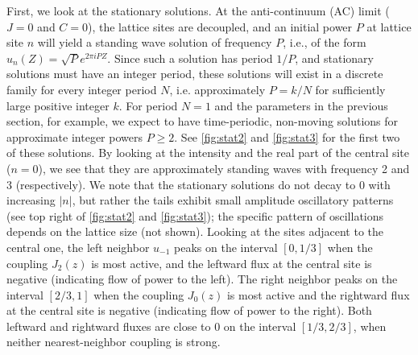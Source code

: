 \documentclass[reprint, amsmath,amssymb,aps,pre]{revtex4-2}
\begin{document}
First, we look at the stationary solutions. At the anti-continuum (AC) limit ($J=0$ and $C=0$), the lattice sites are decoupled, and an initial power $P$ at lattice site $n$ will yield a standing wave solution of frequency $P$, i.e., of the form $u_n(Z) = \sqrt{P} e^{ 2 \pi i P Z}$. Since such a solution has period $1/P$, and stationary solutions must have an integer period, these solutions will exist in a discrete family for every integer period $N$, i.e. approximately $P = k/N$ for sufficiently large positive integer $k$. For period $N=1$ and the parameters in the previous section, for example, we expect to have
time-periodic, non-moving solutions for approximate integer powers $P \geq 2$. See \cref{fig:stat2} and \cref{fig:stat3} for the first two of these solutions. By looking at the intensity and the real part of the central site ($n=0$), we see that they are approximately standing waves with frequency 2 and 3 (respectively). We note that the stationary solutions do not decay to 0 with increasing $|n|$, but rather the tails exhibit small amplitude oscillatory patterns (see top right of \cref{fig:stat2} and \cref{fig:stat3}); the specific pattern of oscillations depends on the lattice size (not shown).
Looking at the sites adjacent to the central one, the left neighbor $u_{-1}$ peaks on the interval $[0,1/3]$ when the coupling $J_2(z)$ is most active, and the leftward flux at the central site is negative (indicating flow of power to the left). The right neighbor peaks on the interval $[2/3, 1]$ when the coupling $J_0(z)$ is most active and the rightward flux at the central site is negative (indicating flow of power to the right). Both leftward and rightward fluxes are close to 0 on the interval $[1/3, 2/3]$, when neither nearest-neighbor coupling is strong.
\end{document}
